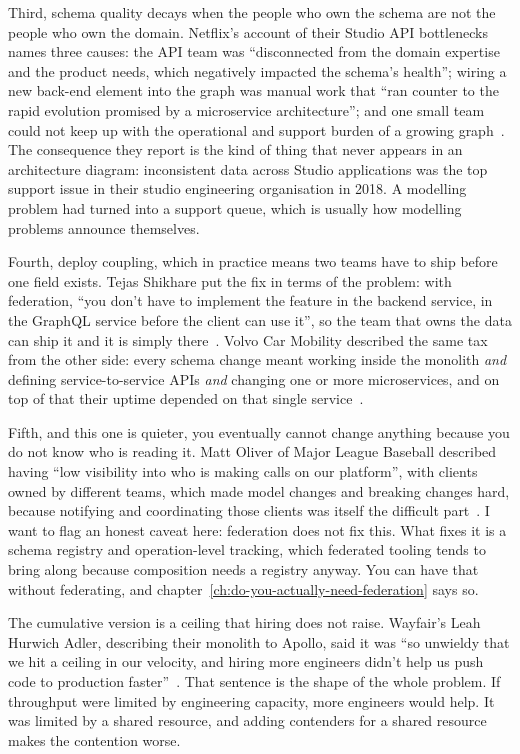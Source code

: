 %
Third, schema quality decays when the people who own the schema are not the
people who own the domain. Netflix's account of their Studio API bottlenecks
names three causes: the API team was \enquote{disconnected from the domain
expertise and the product needs, which negatively impacted the schema's
health}; wiring a new back-end element into the graph was manual work that
\enquote{ran counter to the rapid evolution promised by a microservice
architecture}; and one small team could not keep up with the operational and
support burden of a growing graph~\autocite{shikhare2020netflix1}. The
consequence they report is the kind of thing that never appears in an
architecture diagram: inconsistent data across Studio applications was the top
support issue in their studio engineering organisation in 2018. A modelling
problem had turned into a support queue, which is usually how modelling problems
announce themselves.

%
Fourth, deploy coupling, which in practice means two teams have to ship before
one field exists. Tejas Shikhare put the fix in terms of the problem: with
federation, \enquote{you don't have to implement the feature in the backend
service, in the GraphQL service before the client can use it}, so the team that
owns the data can ship it and it is simply
there~\autocite{shikhare2023podcast}. Volvo Car Mobility described the same
tax from the other side: every schema change meant working inside the monolith
\emph{and} defining service-to-service APIs \emph{and} changing one or more
microservices, and on top of that their uptime depended on that single
service~\autocite{radjavi2023volvo}.

%
Fifth, and this one is quieter, you eventually cannot change anything because
you do not know who is reading it. Matt Oliver of Major League Baseball
described having \enquote{low visibility into who is making calls on our
platform}, with clients owned by different teams, which made model changes and
breaking changes hard, because notifying and coordinating those clients was
itself the difficult part~\autocite{oliver2022mlb}. I want to flag an honest
caveat here: federation does not fix this. What fixes it is a schema registry
and operation-level tracking, which federated tooling tends to bring along
because composition needs a registry anyway. You can have that without
federating, and chapter~\ref{ch:do-you-actually-need-federation} says so.

%
The cumulative version is a ceiling that hiring does not raise. Wayfair's Leah
Hurwich Adler, describing their monolith to Apollo, said it was \enquote{so
unwieldy that we hit a ceiling in our velocity, and hiring more engineers didn't
help us push code to production faster}~\autocite{adler2024wayfair}. That
sentence is the shape of the whole problem. If throughput were limited by
engineering capacity, more engineers would help. It was limited by a shared
resource, and adding contenders for a shared resource makes the contention
worse.

